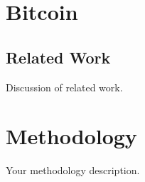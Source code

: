 \documentclass[12pt]{article}
\begin{document}
\newpage

\section{Bitcoin}







\newpage
\subsection{Related Work}
Discussion of related work.


\newpage
\section{Methodology}
Your methodology description.



\newpage
\end{document}
